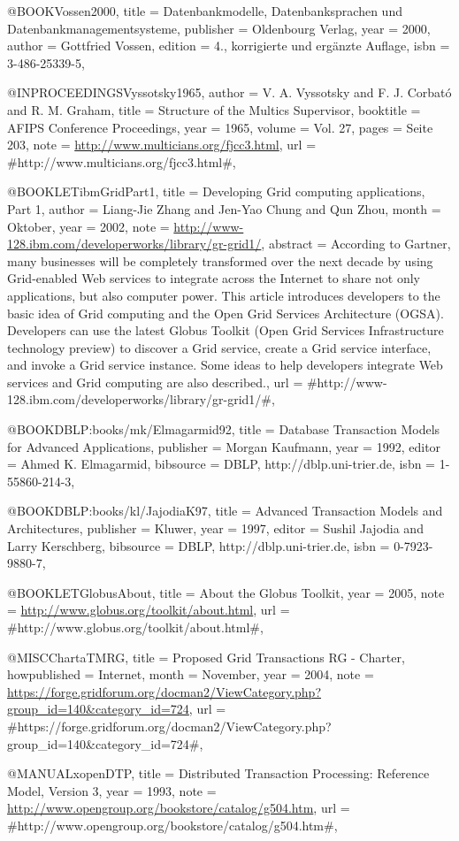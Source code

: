 @BOOK{Vossen2000,
  title = {{Datenbankmodelle, Datenbanksprachen und Datenbankmanagementsysteme}},
  publisher = {Oldenbourg Verlag},
  year = {2000},
  author = {Gottfried Vossen},
  edition = {4., korrigierte und ergänzte Auflage},
  isbn = {3-486-25339-5},
}

@INPROCEEDINGS{Vyssotsky1965,
  author = {V. A. Vyssotsky and F. J. Corbató and R. M. Graham},
  title = {{Structure of the Multics Supervisor}},
  booktitle = {AFIPS Conference Proceedings},
  year = {1965},
  volume = {Vol. 27},
  pages = {Seite 203},
  note = {\url{http://www.multicians.org/fjcc3.html}},
  url = {#http://www.multicians.org/fjcc3.html#},
}

@BOOKLET{ibmGridPart1,
  title = {{Developing Grid computing applications, Part 1}},
  author = {Liang-Jie Zhang and Jen-Yao Chung and Qun Zhou},
  month = {Oktober},
  year = {2002},
  note = {\url{http://www-128.ibm.com/developerworks/library/gr-grid1/}},
  abstract = {According to Gartner, many businesses will be completely transformed
over
	the next decade by using Grid-enabled Web services to integrate
across
	the Internet to share not only applications, but also computer
power.
	This article introduces developers to the basic idea of Grid
computing
	and the Open Grid Services Architecture (OGSA). Developers can
use
	the latest Globus Toolkit (Open Grid Services Infrastructure
technology
	preview) to discover a Grid service, create a Grid service
interface,
	and invoke a Grid service instance. Some ideas to help
developers
	integrate Web services and Grid computing are also described.},
  url = {#http://www-128.ibm.com/developerworks/library/gr-grid1/#},
}

@BOOK{DBLP:books/mk/Elmagarmid92,
  title = {{Database Transaction Models for Advanced Applications}},
  publisher = {Morgan Kaufmann},
  year = {1992},
  editor = {Ahmed K. Elmagarmid},
  bibsource = {DBLP, http://dblp.uni-trier.de},
  isbn = {1-55860-214-3},
}

@BOOK{DBLP:books/kl/JajodiaK97,
  title = {{Advanced Transaction Models and Architectures}},
  publisher = {Kluwer},
  year = {1997},
  editor = {Sushil Jajodia and Larry Kerschberg},
  bibsource = {DBLP, http://dblp.uni-trier.de},
  isbn = {0-7923-9880-7},
}

@BOOKLET{GlobusAbout,
  title = {{About the Globus Toolkit}},
  year = {2005},
  note = {\url{http://www.globus.org/toolkit/about.html}},
  url = {#http://www.globus.org/toolkit/about.html#},
}

@MISC{ChartaTMRG,
  title = {{Proposed Grid Transactions RG - Charter}},
  howpublished = {Internet},
  month = {November},
  year = {2004},
  note = {\url{https://forge.gridforum.org/docman2/ViewCategory.php?group_id=140\&category_id=724}},
  url = {#https://forge.gridforum.org/docman2/ViewCategory.php?group_id=140&category_id=724#},
}

@MANUAL{xopenDTP,
  title = {{Distributed Transaction Processing: Reference Model, Version 3}},
  year = {1993},
  note = {\url{http://www.opengroup.org/bookstore/catalog/g504.htm}},
  url = {#http://www.opengroup.org/bookstore/catalog/g504.htm#},
}

